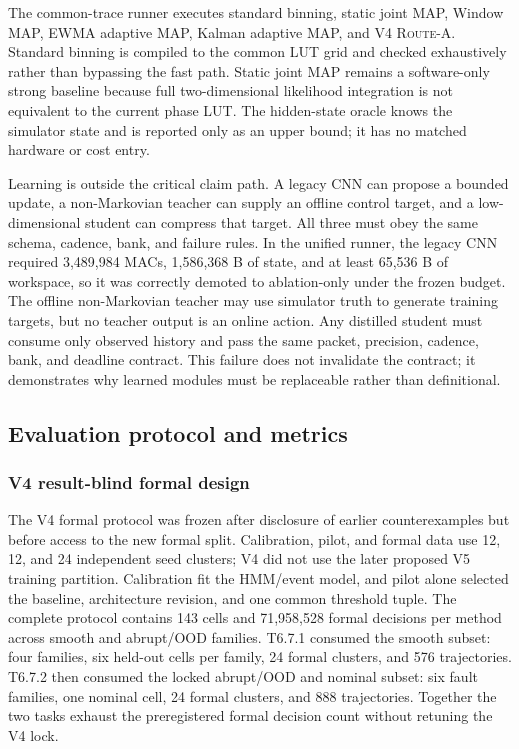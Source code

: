 \documentclass[11pt]{article}
\newcommand{\RouteA}{\textsc{Route-A}}
\begin{document}
The common-trace runner executes standard binning, static joint MAP, Window
MAP, EWMA adaptive MAP, Kalman adaptive MAP, and V4 \RouteA{}.  Standard
binning is compiled to the common LUT grid and checked exhaustively rather than
bypassing the fast path.  Static joint MAP remains a software-only strong
baseline because full two-dimensional likelihood integration is not equivalent
to the current phase LUT.  The hidden-state oracle knows the simulator state
and is reported only as an upper bound; it has no matched hardware or cost
entry.

Learning is outside the critical claim path.  A legacy CNN can propose a
bounded update, a non-Markovian teacher can supply an offline control target,
and a low-dimensional student can compress that target.  All three must obey
the same schema, cadence, bank, and failure rules.  In the unified runner, the
legacy CNN required 3,489,984 MACs, 1,586,368 B of state, and at least 65,536 B
of workspace, so it was correctly demoted to ablation-only under the frozen
budget.  The offline non-Markovian teacher may use simulator truth to generate
training targets, but no teacher output is an online action.  Any distilled
student must consume only observed history and pass the same packet, precision,
cadence, bank, and deadline contract.  This failure does not invalidate the
contract; it demonstrates why learned modules must be replaceable rather than
definitional.

\subsection{Evaluation protocol and metrics}

\subsubsection{V4 result-blind formal design}

The V4 formal protocol was frozen after disclosure of earlier counterexamples
but before access to the new formal split.  Calibration, pilot, and formal data
use 12, 12, and 24 independent seed clusters; V4 did not use the later proposed
V5 training partition.  Calibration fit the HMM/event model, and pilot alone
selected the baseline, architecture revision, and one common threshold tuple.
The complete protocol contains 143 cells and 71,958,528 formal decisions per
method across smooth and abrupt/OOD families.  T6.7.1 consumed the smooth
subset: four families, six held-out cells per family, 24 formal clusters, and
576 trajectories.  T6.7.2 then consumed the locked abrupt/OOD and nominal
subset: six fault families, one nominal cell, 24 formal clusters, and 888
trajectories.  Together the two tasks exhaust the preregistered formal decision
count without retuning the V4 lock.
\end{document}
